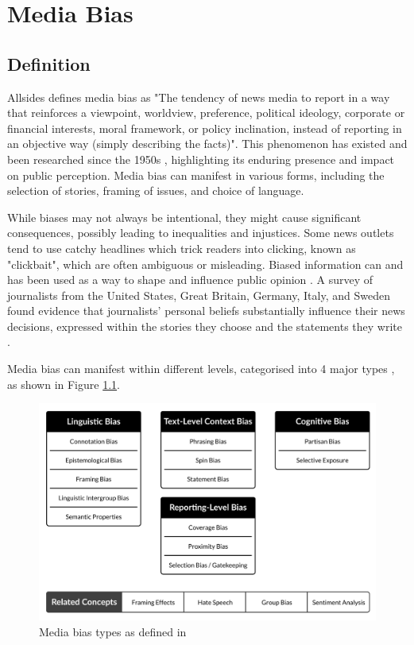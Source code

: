 \chapter{Media Bias}
\label{cha:2}

\section{Definition} \label{media-bias-definition}

Allsides \cite{allsides-2022-bias-definition} defines media bias as "The tendency of news media to report in a way that reinforces a viewpoint, worldview, preference, political ideology, corporate or financial interests, moral framework, or policy inclination, instead of reporting in an objective way (simply describing the facts)". This phenomenon has existed and been researched since the 1950s \cite{white-1950-case-study-selection-news}, highlighting its enduring presence and impact on public perception. Media bias can manifest in various forms, including the selection of stories, framing of issues, and choice of language.

While biases may not always be intentional, they might cause significant consequences, possibly leading to inequalities and injustices. Some news outlets tend to use catchy headlines which trick readers into clicking, known as "clickbait", which are often ambiguous or misleading. Biased information can and has been used as a way to shape and influence public opinion \cite{aires-2020-information}. A survey of journalists from the United States, Great Britain, Germany, Italy, and Sweden found evidence that journalists' personal beliefs substantially influence their news decisions, expressed within the stories they choose and the statements they write \cite{patterson-donsbach-1996-news-decisions}.

Media bias can manifest within different levels, categorised into 4 major types \cite{spinde-2024-taxonomy}, as shown in Figure \ref{fig:bias-types-taxonomy}.

\begin{figure}[htbp]
    \centering
    \includegraphics[width=0.9\linewidth]{images/bias-types-taxonomy.png}
    \caption{Media bias types as defined in \cite{spinde-2024-taxonomy}}
    \label{fig:bias-types-taxonomy}
\end{figure}


